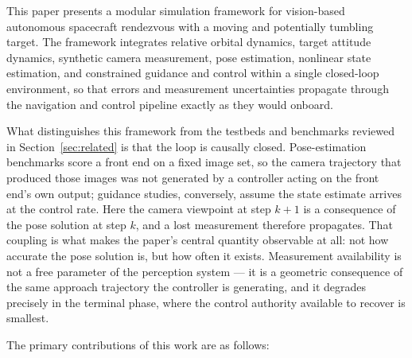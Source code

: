 This paper presents a modular simulation framework for vision-based
autonomous spacecraft rendezvous with a moving and potentially tumbling target.
The framework integrates relative orbital dynamics, target attitude dynamics,
synthetic camera measurement, pose estimation, nonlinear state estimation, and
constrained guidance and control within a single closed-loop environment, so
that errors and measurement uncertainties propagate through the navigation and
control pipeline exactly as they would onboard.

What distinguishes this framework from the testbeds and benchmarks reviewed in
Section~\ref{sec:related} is that the loop is causally closed. Pose-estimation
benchmarks score a front end on a fixed image set, so the camera trajectory
that produced those images was not generated by a controller acting on the
front end's own output; guidance studies, conversely, assume the state
estimate arrives at the control rate. Here the camera viewpoint at step $k+1$
is a consequence of the pose solution at step $k$, and a lost measurement
therefore propagates. That coupling is what makes the paper's central quantity
observable at all: not how accurate the pose solution is, but how often it
exists. Measurement availability is not a free parameter of the perception
system --- it is a geometric consequence of the same approach trajectory the
controller is generating, and it degrades precisely in the terminal phase,
where the control authority available to recover is smallest.

The primary contributions of this work are as follows:

